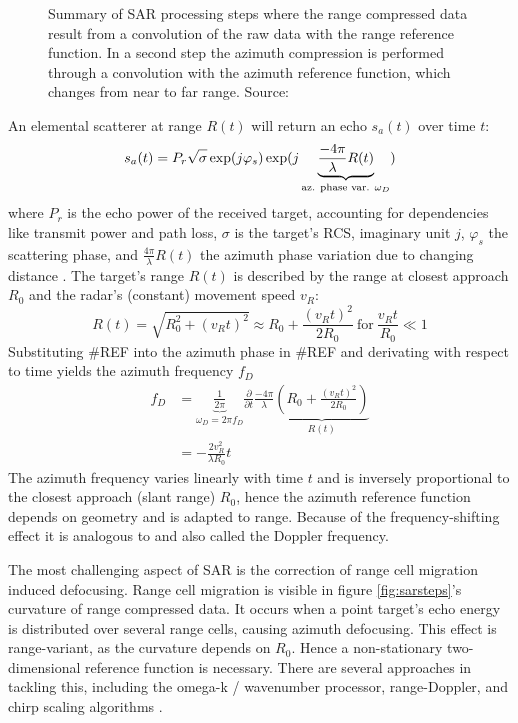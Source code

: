 \begin{figure}[htp]
    \centering
    \label{fig:sar_steps}
    \def\svgwidth{\linewidth}
    
    \caption{Summary of SAR processing steps where the range compressed data result from a convolution of the raw data with the range reference function. In a second step the azimuth compression is performed through a convolution with the azimuth reference function, which changes from near to far range. Source: \cite{Moreira2013}}
\end{figure}

An elemental scatterer at range \(R(t)\) will return an echo \(s_a(t)\)
over time \(t\): \[
s_a(t) = P_r \sqrt{\sigma\vphantom{1}} \exp(j\varphi_s)\exp(j \underbrace{\frac{-4\pi}{\lambda}R(t)}_\text{az. phase var. $\omega_D$})
\] where \(P_r\) is the echo power of the received target, accounting
for dependencies like transmit power and path loss, \(\sigma\) is the
target's RCS, imaginary unit \(j\), \(\varphi_s\) the scattering phase,
and \(\frac{4\pi}{\lambda}R(t)\) the azimuth phase variation due to
changing distance \cite{Cumming2004}. The target's range \(R(t)\) is
described by the range at closest approach \(R_0\) and the radar's
(constant) movement speed \(v_R\): \[
R(t) = \sqrt{R_0^2+\left(v_Rt\right)^2} \approx R_0 + \frac{(v_Rt)^2}{2R_0} ~\text{for}~ \frac{v_Rt}{R_0} \ll 1
\] Substituting \#REF into the azimuth phase in \#REF and derivating
with respect to time yields the azimuth frequency \(f_D\) \[
\begin{aligned}
f_D &= \underbrace{\frac{1}{2\pi}}_{\omega_D = 2\pi f_D} \frac{\partial}{\partial t} \frac{-4\pi}{\lambda}  \underbrace{\left( R_0 + \frac{(v_Rt)^2}{2R_0}  \right)}_{R(t)} \\
&= -\frac{2v_R^2}{\lambda R_0}t
\end{aligned}
\] The azimuth frequency varies linearly with time \(t\) and is
inversely proportional to the closest approach (slant range) \(R_0\),
hence the azimuth reference function depends on geometry and is adapted
to range. Because of the frequency-shifting effect it is analogous to
and also called the Doppler frequency.

The most challenging aspect of SAR is the correction of range cell
migration induced defocusing. Range cell migration is visible in figure
\ref{fig:sarsteps}'s curvature of range compressed data. It occurs when a point
target's echo energy is distributed over several range cells, causing
azimuth defocusing. This effect is range-variant, as the curvature
depends on \(R_0\). Hence a non-stationary two-dimensional reference
function is necessary. There are several approaches in tackling this,
including the omega-k / wavenumber processor, range-Doppler, and chirp
scaling algorithms \cite{Moreira2013}.

